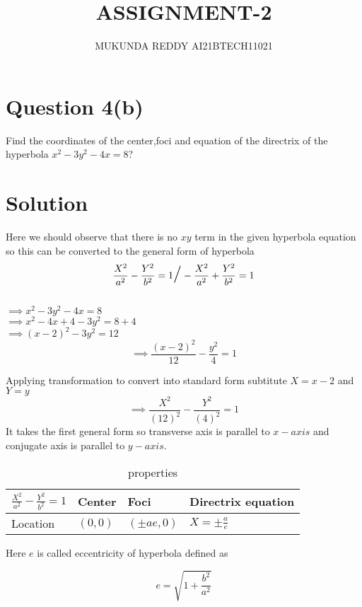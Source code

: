\documentclass[journal,12pt,twocolumn]{article}
\newcommand{\generaleqa}{\frac{X^2}{a^2} - \frac{Y^2}{b^2} = 1}
\newcommand{\generaleqb}{-\frac{X^2}{a^2} + \frac{Y^2}{b^2} = 1}
\newcommand{\subtitute}[2]{\frac{X^2}{(#1)^2} - \frac{Y^2}{(#2)^2} = 1}
\begin{document}
\title{ASSIGNMENT-2}
\author{MUKUNDA REDDY AI21BTECH11021}
\date{}
\maketitle

\section*{\Large{Question 4(b)}}
Find the coordinates of the center,foci and equation of
the directrix of the hyperbola
$x^{2}-3y^{2}-4x=8$?\\
 \hline
\section*{Solution}
Here we should observe that there is no $xy$ term in the
given hyperbola equation so this can be converted to the
general form of hyperbola $$\generaleqa   \text{\LARGE$/$} \generaleqb$$\\

$\implies x^2-3y^2-4x = 8$\\
$\implies x^2-4x+4-3y^2 = 8+4$\\
$\implies (x-2)^2-3y^2 = 12$\\
\begin{equation}
\implies \frac{(x-2)^2}{12}-\frac{y^2}{4} = 1
\end{equation}

Applying transformation to convert into standard form
subtitute $X=x-2$ and $Y = y$ $$\implies \subtitute{12}{4} $$
It takes the first general form so transverse axis is parallel
to $x-axis$ and conjugate axis is parallel to $y-axis$.

\begin{table}[t]
    \centering
    \hline
    \renewcommand{\arraystretch}{2}
    \begin{tabular}{|p{2.2cm}|p{1.2cm}|p{1.2cm}|p{1.7cm}|}
    $\generaleqa$  & Center & Foci & Directrix equation\\ \hline
      Location  &   $(0,0)$ & $(\pm ae,0)$ & $X=\pm \frac{a}{e}$\\ \hline
    \end{tabular}
    \caption*{properties}
\end{table}

Here $e$ is called eccentricity of hyperbola defined as

\begin{equation}
\label{eccentricity}
 e=\sqrt{1+\frac{b^2}{a^2}} 
\end{equation}
\end{document}
